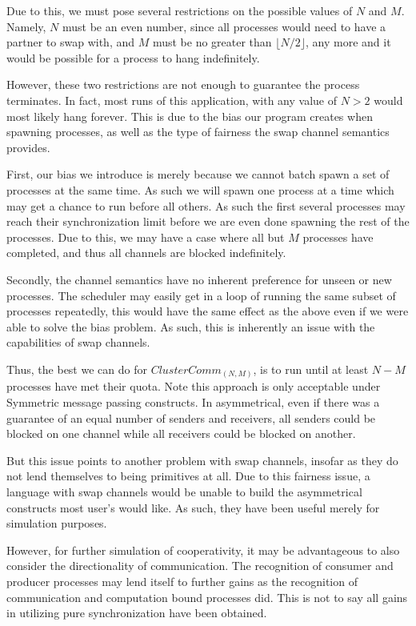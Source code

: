 Due to this, we must pose several restrictions on the possible values of $N$ and
$M$. Namely, $N$ must be an even number, since all processes would need to have a 
partner to swap with, and $M$ must be no greater than $\lfloor N/2 \rfloor$, any
more and it would be possible for a process to hang indefinitely.

However, these two restrictions are not enough to guarantee the process terminates.
In fact, most runs of this application, with any value of $N > 2$ would most 
likely hang forever. This is due to the bias our program creates when spawning
processes, as well as the type of fairness the swap channel semantics provides.

First, our bias we introduce is merely because we cannot batch spawn a set of
processes at the same time. As such we will spawn one process at a time which
may get a chance to run before all others. As such the first several processes
may reach their synchronization limit before we are even done spawning the rest
of the processes. Due to this, we may have a case where all but $M$ processes
have completed, and thus all channels are blocked indefinitely.

Secondly, the channel semantics have no inherent preference for unseen 
or new processes. The scheduler may easily get in a loop of running the same
subset of processes repeatedly, this would have the same effect as the above
even if we were able to solve the bias problem. As such, this is inherently an
issue with the capabilities of swap channels. 

Thus, the best we can do for $ClusterComm_{(N,M)}$, is to run until at least 
$N-M$ processes have met their quota. Note this approach is only acceptable 
under Symmetric message passing constructs. In asymmetrical, even if there was
a guarantee of an equal number of senders and receivers, all senders could be
blocked on one channel while all receivers could be blocked on another. 

But this issue points to another problem with swap channels, insofar as they do
not lend themselves to being primitives at all. Due to this fairness issue, a 
language with swap channels would be unable to build the asymmetrical constructs
most user's would like. As such, they have been useful merely for simulation 
purposes.

However, for further simulation of cooperativity, it may be advantageous to also 
consider the directionality of communication. The recognition of consumer and 
producer processes may lend itself to further gains as the recognition of 
communication and computation bound processes did. This is not to say all gains
in utilizing pure synchronization have been obtained. 
